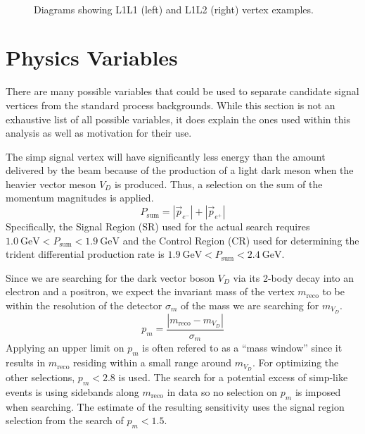 \begin{figure}
  \centering
  \begin{subfigure}{0.48\textwidth}
    \centering
    \resizebox{\textwidth}{!}{}
  \end{subfigure}
  ~
  \begin{subfigure}{0.48\textwidth}
    \centering
    \resizebox{\textwidth}{!}{}
  \end{subfigure}
  \caption{Diagrams showing L1L1 (left) and L1L2 (right) vertex examples.}
  \label{fig:hps-reco-category-diagram}
\end{figure}

\section{Physics Variables}
\label{sec:hps:analysis:variables}
There are many possible variables that could be used to separate candidate signal
vertices from the standard process backgrounds.
While this section is not an exhaustive list of all possible variables,
it does explain the ones used within this analysis as well as motivation for
their use.

The \ac{simp} signal vertex will have significantly less energy than the amount
delivered by the beam because of the production of a light dark meson when the heavier
vector meson $V_D$ is produced.
Thus, a selection on the sum of the momentum magnitudes is applied.
\begin{equation}
  P_\mathrm{sum} = |\vec{p}_{e^-}|+|\vec{p}_{e^+}|
\end{equation}
Specifically, the Signal Region (SR) used for the actual search requires
$\qty{1.0}{\GeV} < P_\mathrm{sum} < \qty{1.9}{\GeV}$ and the Control Region (CR)
used for determining the trident differential production rate is
$\qty{1.9}{\GeV} < P_\mathrm{sum} < \qty{2.4}{\GeV}$.

Since we are searching for the dark vector boson $V_D$ via its
2-body decay into an electron and a positron, we expect the invariant mass of the vertex $m_\text{reco}$
to be within the resolution of the detector $\sigma_m$ of the mass we are searching for $m_{V_D}$.
\begin{equation}
  p_m = \frac{|m_\text{reco}-m_{V_D}|}{\sigma_m}
\end{equation}
Applying an upper limit on $p_m$ is often refered to as a ``mass window''
since it results in $m_\text{reco}$ residing within a small range around $m_{V_D}$.
For optimizing the other selections, $p_m < 2.8$ is used.
The search for a potential excess of \ac{simp}-like events is using sidebands
along $m_\mathrm{reco}$ in data so no selection on $p_m$ is imposed when searching.
The estimate of the resulting sensitivity uses the signal region selection from
the search of $p_m < 1.5$.

